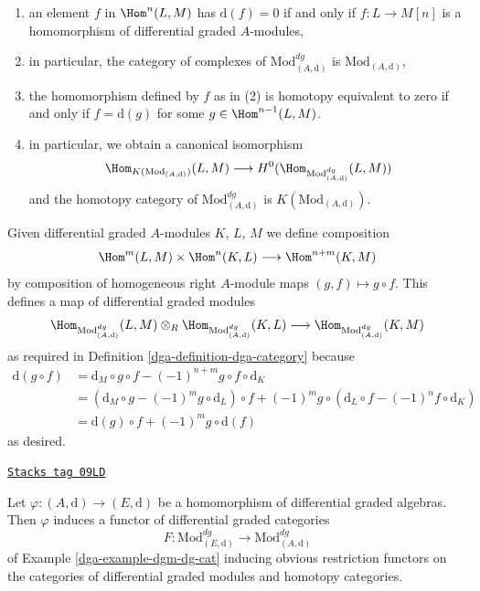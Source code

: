 \begin{example}
\begin{enumerate}
\item an element $f$ in $\Hom^n(L, M)$ has $\text{d}(f) = 0$ if and only if
$f : L \to M[n]$ is a homomorphism of differential graded $A$-modules,
\item in particular, the category of complexes of
$\text{Mod}^{dg}_{(A, \text{d})}$ is $\text{Mod}_{(A, \text{d})}$,
\item the homomorphism defined by $f$ as in (2) is homotopy equivalent
to zero if and only if $f = \text{d}(g)$ for some
$g \in \Hom^{n - 1}(L, M)$.
\item in particular, we obtain a canonical isomorphism
$$
\Hom_{K(\text{Mod}_{(A, \text{d})})}(L, M)
\longrightarrow
H^0(\Hom_{\text{Mod}^{dg}_{(A, \text{d})}}(L, M))
$$
and the homotopy category of $\text{Mod}^{dg}_{(A, \text{d})}$ is
$K(\text{Mod}_{(A, \text{d})})$.
\end{enumerate}
Given differential graded $A$-modules $K$, $L$, $M$ we define
composition
$$
\Hom^m(L, M) \times \Hom^n(K, L) \longrightarrow \Hom^{n + m}(K, M)
$$
by composition of homogeneous right $A$-module maps $(g, f) \mapsto g \circ f$.
This defines a map of differential graded modules
$$
\Hom_{\text{Mod}^{dg}_{(A, \text{d})}}(L, M) \otimes_R
\Hom_{\text{Mod}^{dg}_{(A, \text{d})}}(K, L) \longrightarrow
\Hom_{\text{Mod}^{dg}_{(A, \text{d})}}(K, M)
$$
as required in
Definition \ref{dga-definition-dga-category}
because
\begin{align*}
\text{d}(g \circ f) & =
\text{d}_M \circ g \circ f - (-1)^{n + m} g \circ f \circ \text{d}_K \\
& =
\left(\text{d}_M \circ g - (-1)^m g \circ \text{d}_L\right) \circ f +
(-1)^m g \circ \left(\text{d}_L \circ f - (-1)^n f \circ \text{d}_K\right) \\
& =
\text{d}(g) \circ f + (-1)^m g \circ \text{d}(f)
\end{align*}
as desired.
\end{example}

\begin{lemma}
\label{dga-lemma-homomorphism-induces-dga-functor}
\href{https://stacks.math.columbia.edu/tag/09LD}{\texttt{Stacks tag 09LD}}

Let $\varphi : (A, \text{d}) \to (E, \text{d})$ be a homomorphism of
differential graded algebras. Then $\varphi$ induces a functor of differential
graded categories
$$
F :
\text{Mod}^{dg}_{(E, \text{d})}
\longrightarrow
\text{Mod}^{dg}_{(A, \text{d})}
$$
of Example \ref{dga-example-dgm-dg-cat} inducing obvious restriction functors
on the categories of differential graded modules and homotopy categories.
\end{lemma}

